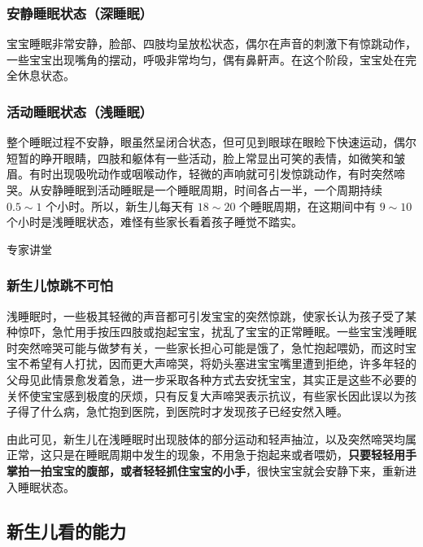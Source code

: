 \subsubsection{安静睡眠状态（深睡眠）}

宝宝睡眠非常安静，脸部、四肢均呈放松状态，偶尔在声音的刺激下有惊跳动作，一些宝宝出现嘴角的摆动，呼吸非常均匀，偶有鼻鼾声。在这个阶段，宝宝处在完全休息状态。

\subsubsection{活动睡眠状态（浅睡眠）}

整个睡眠过程不安静，眼虽然呈闭合状态，但可见到眼球在眼睑下快速运动，偶尔短暂的睁开眼睛，四肢和躯体有一些活动，脸上常显出可笑的表情，如微笑和皱眉。有时出现吸吮动作或咽喉动作，轻微的声响就可引发惊跳动作，有时突然啼哭。从安静睡眠到活动睡眠是一个睡眠周期，时间各占一半，一个周期持续%
$0.5\sim{}1$%
个小时。所以，新生儿每天有%
$18\sim{}20$%
个睡眠周期，在这期间中有%
$9\sim{}10$
个小时是浅睡眠状态，难怪有些家长看着孩子睡觉不踏实。

\begin{mybox}[colback=yellow]{专家讲堂}
\subsubsection*{新生儿惊跳不可怕}
浅睡眠时，一些极其轻微的声音都可引发宝宝的突然惊跳，使家长认为孩子受了某种惊吓，急忙用手按压四肢或抱起宝宝，扰乱了宝宝的正常睡眠。一些宝宝浅睡眠时突然啼哭可能与做梦有关，一些家长担心可能是饿了，急忙抱起喂奶，而这时宝宝不希望有人打扰，因而更大声啼哭，将奶头塞进宝宝嘴里遭到拒绝，许多年轻的父母见此情景愈发着急，进一步采取各种方式去安抚宝宝，其实正是这些不必要的关怀使宝宝感到极度的厌烦，只有反复大声啼哭表示抗议，有些家长因此误以为孩子得了什么病，急忙抱到医院，到医院时才发现孩子已经安然入睡。

由此可见，新生儿在浅睡眠时出现肢体的部分运动和轻声抽泣，以及突然啼哭均属正常，这只是在睡眠周期中发生的现象，不用急于抱起来或者喂奶，\textbf{只要轻轻用手掌拍一拍宝宝的腹部，或者轻轻抓住宝宝的小手}，很快宝宝就会安静下来，重新进入睡眠状态。
\end{mybox}

\subsection{新生儿看的能力}

